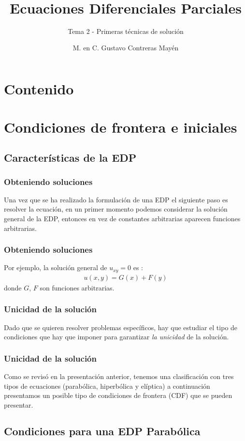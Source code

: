 \documentclass[12pt]{beamer}
\date{}
\title{\large{Ecuaciones Diferenciales Parciales}}
\subtitle{Tema 2 - Primeras técnicas de solución}
\author{M. en C. Gustavo Contreras Mayén}
\begin{document}
\maketitle
\fontsize{14}{14}\selectfont
{}

\section*{Contenido}

\section{Condiciones de frontera e iniciales}
\subsection{Características de la EDP}

\begin{frame}
\frametitle{Obteniendo soluciones}
Una vez que se ha realizado la formulación de una EDP el siguiente paso es resolver la ecuación, en un primer momento podemos considerar la solución general de la EDP, entonces en vez de constantes arbitrarias aparecen funciones arbitrarias.
\end{frame}
\begin{frame}
\frametitle{Obteniendo soluciones}
Por ejemplo, la solución general de $u_{xy} = 0$ es :
\pause
\begin{align*}
u (x, y) = G (x) + F (y)
\end{align*}
donde $G$, $F$ son funciones arbitrarias.
\end{frame}

\begin{frame}
\frametitle{Unicidad de la solución}
Dado que se quieren resolver problemas específicos, hay que estudiar el tipo de condiciones que hay que imponer para garantizar \emph{la unicidad} de la solución.
\end{frame}
\begin{frame}
\frametitle{Unicidad de la solución}
Como se revisó en la presentación anterior, tenemos una clasificación con tres tipos de ecuaciones (parabólica, hiperbólica y elíptica) a continuación presentamos un posible tipo de condiciones de frontera (CDF) que se pueden presentar.
\end{frame}

\subsection{Condiciones para una EDP Parabólica}
\end{document}
